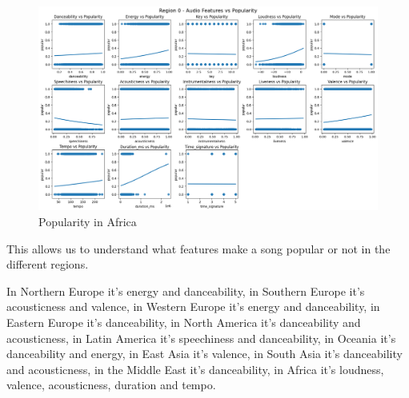 \begin{figure}[h]
    \centering
    \begin{minipage}{0.45\textwidth}
        \centering
        \includegraphics[width=\linewidth]{media/region0_cleaned.png}
        \caption{Popularity in Africa}
        \label{africa}
    \end{minipage}
\end{figure}


This allows us to understand what features make a song popular or not in the different regions.



In Northern Europe it's energy and danceability, in Southern Europe it's acousticness and valence, in Western Europe it's energy and danceability, in Eastern Europe it's danceability, in North America it's danceability and acousticness, in Latin America it's speechiness and danceability, in Oceania it's danceability and energy, in East Asia it's valence, in South Asia it's danceability and acousticness, in the Middle East it's danceability, in Africa it's loudness, valence, acousticness, duration and tempo.   